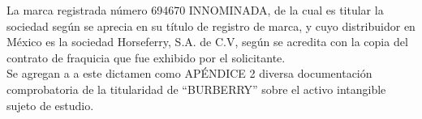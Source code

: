
\textbullet La marca registrada número 694670 INNOMINADA, de la cual es titular la sociedad \textcolor{principal}{\empresaSolicitante} según se aprecia en su título de registro de marca, y cuyo distribuidor en México es la sociedad Horseferry, S.A. de C.V, según se acredita con la copia del contrato de fraquicia que fue exhibido por el solicitante.\\

Se agregan a a este dictamen como \textcolor{secundario}{APÉNDICE 2} diversa documentación comprobatoria de la titularidad de ``BURBERRY'' sobre el activo intangible sujeto de estudio.
